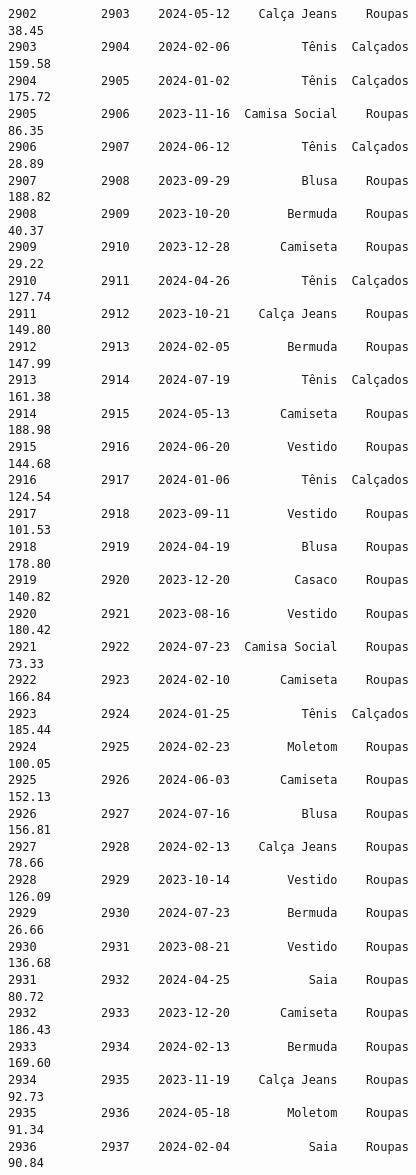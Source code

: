 \documentclass[11pt]{article}
\begin{document}
\begin{Verbatim}[commandchars=\\\{\}]
2902         2903    2024-05-12    Calça Jeans    Roupas           38.45   
2903         2904    2024-02-06          Tênis  Calçados          159.58   
2904         2905    2024-01-02          Tênis  Calçados          175.72   
2905         2906    2023-11-16  Camisa Social    Roupas           86.35   
2906         2907    2024-06-12          Tênis  Calçados           28.89   
2907         2908    2023-09-29          Blusa    Roupas          188.82   
2908         2909    2023-10-20        Bermuda    Roupas           40.37   
2909         2910    2023-12-28       Camiseta    Roupas           29.22   
2910         2911    2024-04-26          Tênis  Calçados          127.74   
2911         2912    2023-10-21    Calça Jeans    Roupas          149.80   
2912         2913    2024-02-05        Bermuda    Roupas          147.99   
2913         2914    2024-07-19          Tênis  Calçados          161.38   
2914         2915    2024-05-13       Camiseta    Roupas          188.98   
2915         2916    2024-06-20        Vestido    Roupas          144.68   
2916         2917    2024-01-06          Tênis  Calçados          124.54   
2917         2918    2023-09-11        Vestido    Roupas          101.53   
2918         2919    2024-04-19          Blusa    Roupas          178.80   
2919         2920    2023-12-20         Casaco    Roupas          140.82   
2920         2921    2023-08-16        Vestido    Roupas          180.42   
2921         2922    2024-07-23  Camisa Social    Roupas           73.33   
2922         2923    2024-02-10       Camiseta    Roupas          166.84   
2923         2924    2024-01-25          Tênis  Calçados          185.44   
2924         2925    2024-02-23        Moletom    Roupas          100.05   
2925         2926    2024-06-03       Camiseta    Roupas          152.13   
2926         2927    2024-07-16          Blusa    Roupas          156.81   
2927         2928    2024-02-13    Calça Jeans    Roupas           78.66   
2928         2929    2023-10-14        Vestido    Roupas          126.09   
2929         2930    2024-07-23        Bermuda    Roupas           26.66   
2930         2931    2023-08-21        Vestido    Roupas          136.68   
2931         2932    2024-04-25           Saia    Roupas           80.72   
2932         2933    2023-12-20       Camiseta    Roupas          186.43   
2933         2934    2024-02-13        Bermuda    Roupas          169.60   
2934         2935    2023-11-19    Calça Jeans    Roupas           92.73   
2935         2936    2024-05-18        Moletom    Roupas           91.34   
2936         2937    2024-02-04           Saia    Roupas           90.84   

\end{Verbatim}
\end{document}
